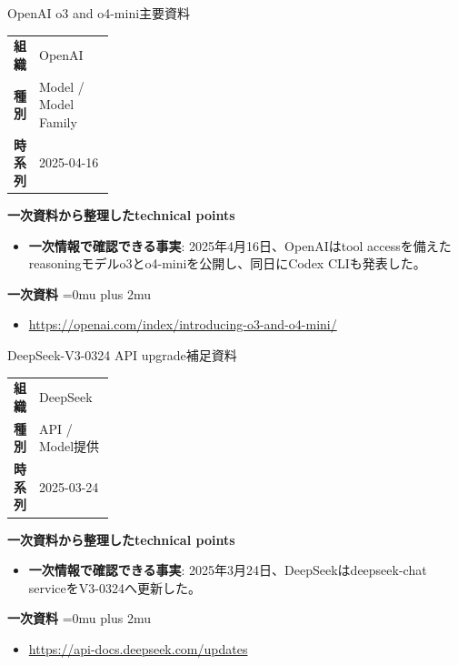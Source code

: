 \begin{technicalnote}{OpenAI o3 and o4-mini}{主要資料}
\begingroup
\begin{tabularx}{\linewidth}{@{}>{\bfseries}p{0.22\linewidth}X@{}}
組織 & OpenAI \\
種別 & Model / Model Family \\
時系列 & 2025-04-16 \\
\end{tabularx}
\smallskip
\begin{minipage}{\linewidth}
{\bfseries 一次資料から整理したtechnical points}
\begin{itemize}[leftmargin=1.5em,itemsep=0.35em]
\item \textbf{一次情報で確認できる事実}: 2025年4月16日、OpenAIはtool accessを備えたreasoningモデルo3とo4-miniを公開し、同日にCodex CLIも発表した。
\end{itemize}
\begin{samepage}
{\bfseries 一次資料}
\begingroup\sloppy
\Urlmuskip=0mu plus 2mu\relax
\begin{itemize}[leftmargin=1.5em,itemsep=0.25em]
\item {\scriptsize\url{https://openai.com/index/introducing-o3-and-o4-mini/}}
\end{itemize}
\endgroup
\end{samepage}
\end{minipage}
\endgroup
\end{technicalnote}
\medskip

\begin{technicalnote}{DeepSeek-V3-0324 API upgrade}{補足資料}
\begingroup
\begin{tabularx}{\linewidth}{@{}>{\bfseries}p{0.22\linewidth}X@{}}
組織 & DeepSeek \\
種別 & API / Model提供 \\
時系列 & 2025-03-24 \\
\end{tabularx}
\smallskip
\begin{minipage}{\linewidth}
{\bfseries 一次資料から整理したtechnical points}
\begin{itemize}[leftmargin=1.5em,itemsep=0.35em]
\item \textbf{一次情報で確認できる事実}: 2025年3月24日、DeepSeekはdeepseek-chat serviceをV3-0324へ更新した。
\end{itemize}
\begin{samepage}
{\bfseries 一次資料}
\begingroup\sloppy
\Urlmuskip=0mu plus 2mu\relax
\begin{itemize}[leftmargin=1.5em,itemsep=0.25em]
\item {\scriptsize\url{https://api-docs.deepseek.com/updates}}
\end{itemize}
\endgroup
\end{samepage}
\end{minipage}
\endgroup
\end{technicalnote}
\medskip

